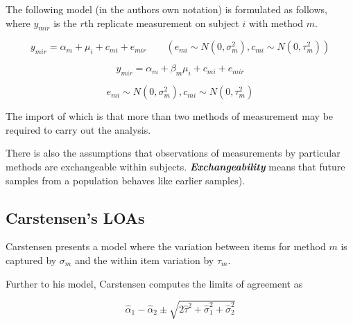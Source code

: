 \documentclass[12pt, a4paper]{report}
\theoremstyle{plain}
\theoremstyle{definition}
\theoremstyle{remark}
\begin{document}
	
	
	
	
	
	
	
	
	
	The following model (in the authors own notation) is
	formulated as follows, where $y_{mir}$ is the $r$th replicate
	measurement on subject $i$ with method $m$.
	
	{
		
		\begin{equation}
		y_{mir}  = \alpha_{m} + \mu_{i} + c_{mi} + e_{mir} \qquad ( e_{mi}
		\sim N(0,\sigma^{2}_{m}), c_{mi} \sim N(0,\tau^{2}_{m}))
		\end{equation}
		
		
		\begin{equation}
		y_{mir}  = \alpha_{m} + \beta_{m}\mu_{i} + c_{mi} + e_{mir} 
		\end{equation}
		
		\[ e_{mi} \sim N(0,\sigma^{2}_{m}), c_{mi} \sim N(0,\tau^{2}_{m})\]
	}
	
	
	The
	import of which is that more than two methods of measurement may
	be required to carry out the analysis. 
	
	There is also the
	assumptions that observations of measurements by particular
	methods are exchangeable within subjects.  \textbf{\textit{Exchangeability}} means
	that future samples from a population behaves like earlier
	samples).
	
	
	
	
	
	
	
	
	
	
	
	\subsection{Carstensen's LOAs}
	Carstensen presents a model where the variation between items for
	method $m$ is captured by $\sigma_m$ and the within item variation
	by $\tau_m$.
	
	Further to his model, Carstensen computes the limits of agreement
	as
	
	\[
	\hat{\alpha}_1 - \hat{\alpha}_2 \pm \sqrt{2 \hat{\tau}^2 +
		\hat{\sigma}^2_1 + \hat{\sigma}^2_2}
	\]
	
\end{document}
